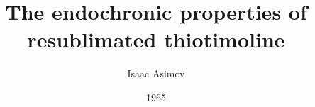 \documentclass{article}
\title{The endochronic properties of resublimated thiotimoline}
\author{Isaac Asimov}
\date{1965}
\begin{document}
\makecoversheet\relax
\makefrontmatter\relax
\end{document}
